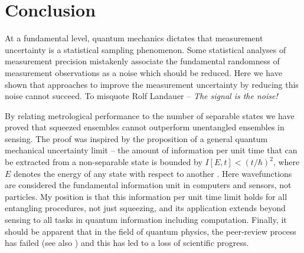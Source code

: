 \documentclass[reqno]{amsart}
\begin{document}

\section*{Conclusion}
At a fundamental level, quantum mechanics dictates that measurement uncertainty is a statistical sampling phenomenon. Some statistical analyses of measurement precision mistakenly associate the fundamental randomness of measurement observations as a noise which should be reduced. Here we have shown that approaches to improve the measurement uncertainty by reducing this noise cannot succeed. To misquote Rolf Landauer \cite{Landauer1998} -- \textit{The signal is the noise!}

By relating metrological performance to the number of separable states we have proved that squeezed ensembles cannot outperform unentangled ensembles in sensing. The proof was inspired by the proposition of a general quantum mechanical uncertainty limit -- the amount of information per unit time that can be extracted from a non-separable state is bounded by $I\left[E,t\right] < (t/\hbar)^2$, where $E$ denotes the energy of any state with respect to another \cite{McGuinness2021a}. Here wavefunctions are considered the fundamental information unit in computers and sensors, not particles. My position is that this information per unit time limit holds for all entangling procedures, not just squeezing, and its application extends beyond sensing to all tasks in quantum information including computation. Finally, it should be apparent that in the field of quantum physics, the peer-review process has failed (see also \cite{McGuinness2022, McGuinness2023, McGuinness2023a}) and this has led to a loss of scientific progress.


%

\newpage
\end{document}

